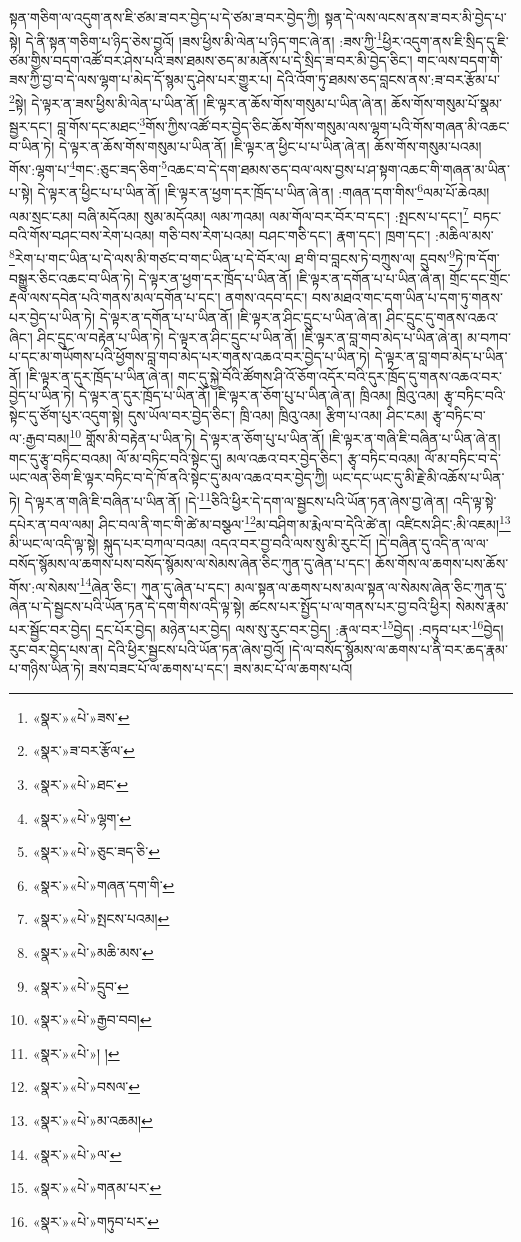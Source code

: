 སྟན་གཅིག་ལ་འདུག་ནས་ཇི་ཙམ་ཟ་བར་བྱེད་པ་དེ་ཙམ་ཟ་བར་བྱེད་ཀྱི། སྟན་དེ་ལས་ལངས་ནས་ཟ་བར་མི་བྱེད་པ་སྟེ། དེ་ནི་སྟན་གཅིག་པ་ཉིད་ཅེས་བྱའོ། །ཟས་ཕྱིས་མི་ལེན་པ་ཉིད་གང་ཞེ་ན། :ཟས་ཀྱི་\footnote{«སྣར་»«པེ་»ཟས་}ཕྱིར་འདུག་ནས་ཇི་སྲིད་དུ་ཇི་ཙམ་གྱིས་བདག་འཚོ་བར་ཤེས་པའི་ཟས་ཐམས་ཅད་མ་མནོས་པ་དེ་སྲིད་ཟ་བར་མི་བྱེད་ཅིང་། གང་ལས་བདག་གི་ཟས་ཀྱི་བྱ་བ་དེ་ལས་ལྷག་པ་མེད་དོ་སྙམ་དུ་ཤེས་པར་གྱུར་པ། དེའི་འོག་ཏུ་ཐམས་ཅད་བླངས་ནས་:ཟ་བར་རྩོམ་པ་\footnote{«སྣར་»ཟ་བར་རྩོལ་}སྟེ། དེ་ལྟར་ན་ཟས་ཕྱིས་མི་ལེན་པ་ཡིན་ནོ། །ཇི་ལྟར་ན་ཆོས་གོས་གསུམ་པ་ཡིན་ཞེ་ན། ཆོས་གོས་གསུམ་པོ་སྣམ་སྦྱར་དང་། བླ་གོས་དང་མཐང་\footnote{«སྣར་»«པེ་»ཐང་}གོས་ཀྱིས་འཚོ་བར་བྱེད་ཅིང་ཆོས་གོས་གསུམ་ལས་ལྷག་པའི་གོས་གཞན་མི་འཆང་བ་ཡིན་ཏེ། དེ་ལྟར་ན་ཆོས་གོས་གསུམ་པ་ཡིན་ནོ། །ཇི་ལྟར་ན་ཕྱིང་པ་པ་ཡིན་ཞེ་ན། ཆོས་གོས་གསུམ་པའམ། གོས་:ལྷག་པ་\footnote{«སྣར་»«པེ་»ལྷག་}གང་:ཅུང་ཟད་ཅིག་\footnote{«སྣར་»«པེ་»ཅུང་ཟད་ཅི་}འཆང་བ་དེ་དག་ཐམས་ཅད་བལ་ལས་བྱས་པ་ཤ་སྟག་འཆང་གི་གཞན་མ་ཡིན་པ་སྟེ། དེ་ལྟར་ན་ཕྱིང་པ་པ་ཡིན་ནོ། །ཇི་ལྟར་ན་ཕྱག་དར་ཁྲོད་པ་ཡིན་ཞེ་ན། :གཞན་དག་གིས་\footnote{«སྣར་»«པེ་»གཞན་དག་གི་}ལམ་པོ་ཆེའམ། ལམ་སྲང་ངམ། བཞི་མདོའམ། སུམ་མདོའམ། ལམ་ཀའམ། ལམ་གོལ་བར་བོར་བ་དང་། :སྤངས་པ་དང་།\footnote{«སྣར་»«པེ་»སྤངས་པའམ།} བཏང་བའི་གོས་བཤང་བས་རེག་པའམ། གཅི་བས་རེག་པའམ། བཤང་གཅི་དང་། རྣག་དང་། ཁྲག་དང་། :མཆིལ་མས་\footnote{«སྣར་»«པེ་»མཆི་མས་}རེག་པ་གང་ཡིན་པ་དེ་ལས་མི་གཙང་བ་གང་ཡིན་པ་དེ་བོར་ལ། ཐ་གི་བ་བླངས་ཏེ་བཀྲུས་ལ། དྲུབས་\footnote{«སྣར་»«པེ་»དྲུབ་}ཏེ་ཁ་དོག་བསྒྱུར་ཅིང་འཆང་བ་ཡིན་ཏེ། དེ་ལྟར་ན་ཕྱག་དར་ཁྲོད་པ་ཡིན་ནོ། །ཇི་ལྟར་ན་དགོན་པ་པ་ཡིན་ཞེ་ན། གྲོང་དང་གྲོང་རྡལ་ལས་དབེན་པའི་གནས་མལ་དགོན་པ་དང་། ནགས་འདབ་དང་། བས་མཐའ་གང་དག་ཡིན་པ་དག་ཏུ་གནས་པར་བྱེད་པ་ཡིན་ཏེ། དེ་ལྟར་ན་དགོན་པ་པ་ཡིན་ནོ། །ཇི་ལྟར་ན་ཤིང་དྲུང་པ་ཡིན་ཞེ་ན། ཤིང་དྲུང་དུ་གནས་འཆའ་ཞིང་། ཤིང་དྲུང་ལ་བརྟེན་པ་ཡིན་ཏེ། དེ་ལྟར་ན་ཤིང་དྲུང་པ་ཡིན་ནོ། །ཇི་ལྟར་ན་བླ་གབ་མེད་པ་ཡིན་ཞེ་ན། མ་བཀབ་པ་དང་མ་གཡོགས་པའི་ཕྱོགས་བླ་གབ་མེད་པར་གནས་འཆའ་བར་བྱེད་པ་ཡིན་ཏེ། དེ་ལྟར་ན་བླ་གབ་མེད་པ་ཡིན་ནོ། །ཇི་ལྟར་ན་དུར་ཁྲོད་པ་ཡིན་ཞེ་ན། གང་དུ་སྐྱེ་བོའི་ཚོགས་ཤི་འོ་ཅོག་འདོར་བའི་དུར་ཁྲོད་དུ་གནས་འཆའ་བར་བྱེད་པ་ཡིན་ཏེ། དེ་ལྟར་ན་དུར་ཁྲོད་པ་ཡིན་ནོ། །ཇི་ལྟར་ན་ཅོག་པུ་པ་ཡིན་ཞེ་ན། ཁྲིའམ། ཁྲིའུ་འམ། རྩྭ་བཏིང་བའི་སྟེང་དུ་ཙོག་པུར་འདུག་སྟེ། དུས་ཡོལ་བར་བྱེད་ཅིང་། ཁྲི་འམ། ཁྲིའུ་འམ། རྩིག་པ་འམ། ཤིང་ངམ། རྩྭ་བཏིང་བ་ལ་:རྒྱབ་བམ།\footnote{«སྣར་»«པེ་»རྒྱབ་བབ།} གློས་མི་བརྟེན་པ་ཡིན་ཏེ། དེ་ལྟར་ན་ཅོག་པུ་པ་ཡིན་ནོ། །ཇི་ལྟར་ན་གཞི་ཇི་བཞིན་པ་ཡིན་ཞེ་ན། གང་དུ་རྩྭ་བཏིང་བའམ། ལོ་མ་བཏིང་བའི་སྟེང་དུ། མལ་འཆའ་བར་བྱེད་ཅིང་། རྩྭ་བཏིང་བའམ། ལོ་མ་བཏིང་བ་དེ་ཡང་ལན་ཅིག་ཇི་ལྟར་བཏིང་བ་དེ་ཁོ་ནའི་སྟེང་དུ་མལ་འཆའ་བར་བྱེད་ཀྱི། ཡང་དང་ཡང་དུ་མི་རྗེ་མི་འཆོས་པ་ཡིན་ཏེ། དེ་ལྟར་ན་གཞི་ཇི་བཞིན་པ་ཡིན་ནོ། །དེ་\footnote{«སྣར་»«པེ་»། །}ཅིའི་ཕྱིར་དེ་དག་ལ་སྦྱངས་པའི་ཡོན་ཏན་ཞེས་བྱ་ཞེ་ན། འདི་ལྟ་སྟེ་དཔེར་ན་བལ་ལམ། ཤིང་བལ་ནི་གང་གི་ཚེ་མ་བསྩལ་\footnote{«སྣར་»«པེ་»བསལ་}མ་བཤིག་མ་རྨེལ་བ་དེའི་ཚེ་ན། འཛིངས་ཤིང་:མི་འཇམ།\footnote{«སྣར་»«པེ་»མ་འཆམ།} མི་ཡང་ལ་འདི་ལྟ་སྟེ། སྐུད་པར་བཀལ་བའམ། འདའ་བར་བྱ་བའི་ལས་སུ་མི་རུང་ངོ། །དེ་བཞིན་དུ་འདི་ན་ལ་ལ་བསོད་སྙོམས་ལ་ཆགས་པས་བསོད་སྙོམས་ལ་སེམས་ཞེན་ཅིང་ཀུན་དུ་ཞེན་པ་དང་། ཆོས་གོས་ལ་ཆགས་པས་ཆོས་གོས་:ལ་སེམས་\footnote{«སྣར་»«པེ་»ལ་}ཞེན་ཅིང་། ཀུན་དུ་ཞེན་པ་དང་། མལ་སྟན་ལ་ཆགས་པས་མལ་སྟན་ལ་སེམས་ཞེན་ཅིང་ཀུན་དུ་ཞེན་པ་དེ་སྦྱངས་པའི་ཡོན་ཏན་དེ་དག་གིས་འདི་ལྟ་སྟེ། ཚངས་པར་སྤྱོད་པ་ལ་གནས་པར་བྱ་བའི་ཕྱིར། སེམས་རྣམ་པར་སྦྱོང་བར་བྱེད། དྲང་པོར་བྱེད། མཉེན་པར་བྱེད། ལས་སུ་རུང་བར་བྱེད། :རྣལ་བར་\footnote{«སྣར་»«པེ་»གནམ་པར་}བྱེད། :བཏུབ་པར་\footnote{«སྣར་»«པེ་»གཏུབ་པར་}བྱེད། རུང་བར་བྱེད་པས་ན། དེའི་ཕྱིར་སྦྱངས་པའི་ཡོན་ཏན་ཞེས་བྱའོ། །དེ་ལ་བསོད་སྙོམས་ལ་ཆགས་པ་ནི་བར་ཆད་རྣམ་པ་གཉིས་ཡིན་ཏེ། ཟས་བཟང་པོ་ལ་ཆགས་པ་དང་། ཟས་མང་པོ་ལ་ཆགས་པའོ། 
